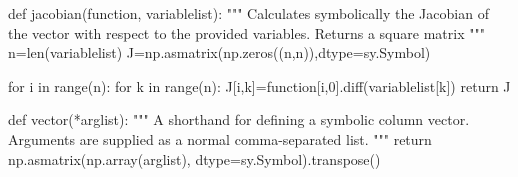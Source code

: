 \documentclass[a4paper]{article}
\begin{document}
\lipsum[1-4] %

\begin{code}[caption={This is my code. There are many like it, but this one is mine.},
         language=Python]
def jacobian(function, variablelist):
    """
    Calculates symbolically the Jacobian of the vector with respect to 
    the provided variables. Returns a square matrix
    """
    n=len(variablelist)
    J=np.asmatrix(np.zeros((n,n)),dtype=sy.Symbol)

    for i in range(n):
        for k in range(n):
            J[i,k]=function[i,0].diff(variablelist[k])
    return J

def vector(*arglist):
    """
    A shorthand for defining a symbolic column vector. Arguments are 
    supplied as a normal comma-separated list.
    """
    return np.asmatrix(np.array(arglist), dtype=sy.Symbol).transpose()
\end{code}
\end{document}
